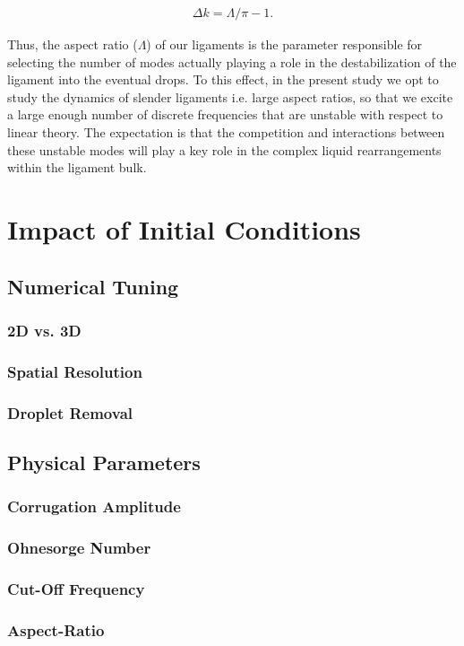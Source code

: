 \begin{align}
 \Delta k = \Lambda / \pi - 1 .  
\end{align}

Thus, the aspect ratio ($\Lambda$) of our ligaments is the parameter 
responsible for selecting the number of modes actually playing a 
role in the destabilization of the ligament into the eventual drops. 
To this effect, in the present study we opt to study the dynamics of 
slender ligaments i.e. large aspect ratios, so that we excite a large enough 
number of discrete frequencies that are unstable with respect to linear theory. 
The expectation is that the competition and interactions 
between these unstable modes will play a key role in the
complex liquid rearrangements within the ligament bulk. 


\section{Impact of Initial Conditions}

\subsection*{Numerical Tuning}

\subsubsection*{2D vs. 3D}

\subsubsection*{Spatial Resolution}

\subsubsection*{Droplet Removal}


\subsection*{Physical Parameters}

\subsubsection*{Corrugation Amplitude}

\subsubsection*{Ohnesorge Number}

\subsubsection*{Cut-Off Frequency}

\subsubsection*{Aspect-Ratio}
